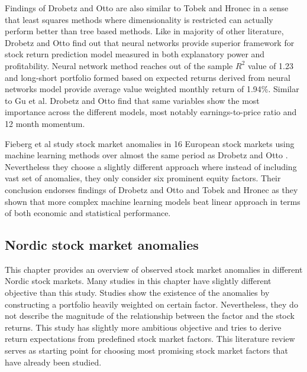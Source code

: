 \documentclass{article}
\begin{document}

Findings of Drobetz and Otto \citeyear{Drobetz} are also similar to Tobek and Hronec \citeyear{TOBEK2021100588} in a sense that least squares methods where dimensionality is restricted can actually perform better than tree based methods. Like in majority of other literature, Drobetz and Otto find out that neural networks provide superior framework for stock return prediction model measured in both explanatory power and profitability. Neural network method reaches out of the sample $R^{2}$ value of 1.23 and long-short portfolio formed based on expected returns derived from neural networks model provide average value weighted monthly return of 1.94\%. Similar to Gu et al. \citeyear{guetal} Drobetz and Otto find that same variables show the most importance across the different models, most notably earnings-to-price ratio and 12 month momentum. \par

Fieberg et al \citeyear{Fieberg} study stock market anomalies in 16 European stock markets using machine learning methods over almost the same period as Drobetz and Otto \citeyear{Drobetz} \footnotemark. Nevertheless they choose a slightly different approach where instead of including vast set of anomalies, they only consider six prominent equity factors. Their conclusion endorses findings of Drobetz and Otto \citeyear{Drobetz} and Tobek and Hronec \citeyear{TOBEK2021100588} as they shown that more complex machine learning models beat linear approach in terms of both economic and statistical performance. \par


\subsection{Nordic stock market anomalies}\label{NordicStockMarketAnomalies}

This chapter provides an overview of observed stock market anomalies in different Nordic stock markets. Many studies in this chapter have slightly different objective than this study. Studies show the existence of the anomalies by constructing a portfolio heavily weighted on certain factor. Nevertheless, they do not describe the magnitude of the relationship between the factor and the stock returns. This study has slightly more ambitious objective and tries to derive return expectations from predefined stock market factors. This literature review serves as starting point for choosing most promising stock market factors that have already been studied. \par
\end{document}
